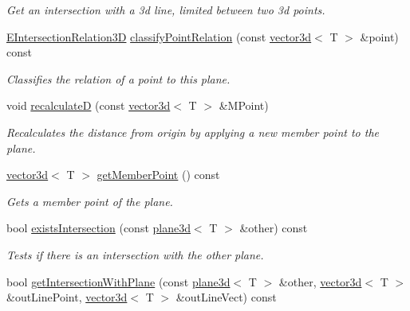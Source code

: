 \begin{DoxyCompactItemize}
\begin{DoxyCompactList}\small\item\em Get an intersection with a 3d line, limited between two 3d points. \end{DoxyCompactList}\item 
\hyperlink{namespaceirr_1_1core_a8a9999eb0d151083f48afe5f7d17a96c}{E\+Intersection\+Relation3D} \hyperlink{classirr_1_1core_1_1plane3d_a14ba310b0ed9d14ce575f1c783cbd9a5}{classify\+Point\+Relation} (const \hyperlink{classirr_1_1core_1_1vector3d}{vector3d}$<$ T $>$ \&point) const
\begin{DoxyCompactList}\small\item\em Classifies the relation of a point to this plane. \end{DoxyCompactList}\item 
\mbox{\label{classirr_1_1core_1_1plane3d_a65c1748d516ddc820b6b970f9367f1ff}} 
void \hyperlink{classirr_1_1core_1_1plane3d_a65c1748d516ddc820b6b970f9367f1ff}{recalculateD} (const \hyperlink{classirr_1_1core_1_1vector3d}{vector3d}$<$ T $>$ \&M\+Point)
\begin{DoxyCompactList}\small\item\em Recalculates the distance from origin by applying a new member point to the plane. \end{DoxyCompactList}\item 
\mbox{\label{classirr_1_1core_1_1plane3d_a6862a53e67b3a8d616986216167d0c7a}} 
\hyperlink{classirr_1_1core_1_1vector3d}{vector3d}$<$ T $>$ \hyperlink{classirr_1_1core_1_1plane3d_a6862a53e67b3a8d616986216167d0c7a}{get\+Member\+Point} () const
\begin{DoxyCompactList}\small\item\em Gets a member point of the plane. \end{DoxyCompactList}\item 
bool \hyperlink{classirr_1_1core_1_1plane3d_a62f0838578d34260a5ef664718be59b4}{exists\+Intersection} (const \hyperlink{classirr_1_1core_1_1plane3d}{plane3d}$<$ T $>$ \&other) const
\begin{DoxyCompactList}\small\item\em Tests if there is an intersection with the other plane. \end{DoxyCompactList}\item 
bool \hyperlink{classirr_1_1core_1_1plane3d_aa50063460dbcda6bc2b61ec4e9a15f0c}{get\+Intersection\+With\+Plane} (const \hyperlink{classirr_1_1core_1_1plane3d}{plane3d}$<$ T $>$ \&other, \hyperlink{classirr_1_1core_1_1vector3d}{vector3d}$<$ T $>$ \&out\+Line\+Point, \hyperlink{classirr_1_1core_1_1vector3d}{vector3d}$<$ T $>$ \&out\+Line\+Vect) const

\end{DoxyCompactItemize}
